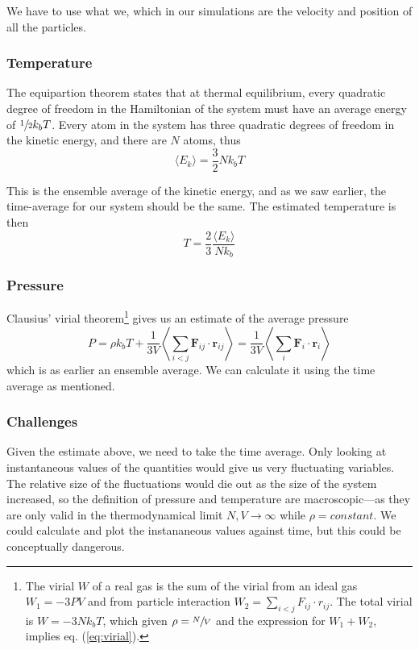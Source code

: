 \documentclass[11pt]{article}
\numberwithin{equation}{section}
\numberwithin{figure}{section}
\renewcommand\vec[1]{\mathbf{#1}}
\renewcommand\vec[1]{\mathbf{#1}}
\renewcommand\vec[1]{\mathbf{#1}}
\begin{document}
We have to use what we, which in our simulations are
the velocity and position of all the particles.

\subsubsection{Temperature}
The equipartion theorem states that at thermal equilibrium,
every quadratic degree of freedom in the Hamiltonian of the system
must have an average energy of $\sfrac{1}{2}k_b T$.
Every atom in the system has three quadratic degrees of freedom in the
kinetic energy, and there
are $N$ atoms, thus
\begin{equation}
    \langle E_k \rangle = \frac{3}{2}N k_b T
\end{equation} 

This is the ensemble average of the kinetic energy,
and as we saw earlier, the time-average for our system should be the same.
The estimated temperature is then
\begin{equation}
    T = \frac{2}{3} \frac{\langle E_k \rangle}{N k_b}
\end{equation}

\subsubsection{Pressure}
Clausius' virial theorem\footnote{The virial $W$ of a real gas
is the sum of the virial from an ideal gas $W_1=-3PV$
and from particle interaction $W_2=\sum_{i<j} F_{ij}\cdot r_{ij}$.
The total virial is $W = - 3N k_b T$, which given
$\rho=\sfrac{N}{V}$ and the expression for $W_1+W_2$,
implies eq. (\ref{eq:virial}).}
gives us an estimate of the average pressure
\begin{equation}
    P = \rho k_b T
    + \frac{1}{3V}\left\langle 
    \sum_{i<j}\vec F_{ij}\cdot \vec r_{ij}
    \right\rangle
    = \frac{1}{3V}\left\langle 
    \sum_{i}\vec F_i\cdot \vec r_{i}
    \right\rangle
    \label{eq:virial}
\end{equation}
which is as earlier an ensemble average. We can calculate
it using the time average as mentioned.

\subsubsection{Challenges}
Given the estimate above, we need to take the time average.
Only looking at instantaneous values of the quantities would
give us very fluctuating variables.
The relative size of the fluctuations would die out as
the size of the system increased, so the definition of pressure
and temperature are macroscopic---as they are only valid in the 
thermodynamical limit $N, V \rightarrow \infty$ while $\rho = constant$.
We could calculate and plot the instananeous values against time,
but this could be conceptually dangerous.
\end{document}
